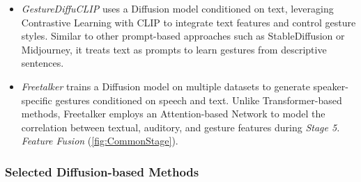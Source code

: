 \begin{itemize}
	\item \textit{GestureDiffuCLIP} \citep{ao2023gesturediffuclip} uses a Diffusion model conditioned on text, leveraging Contrastive Learning with CLIP to integrate text features and control gesture styles. Similar to other prompt-based approaches such as StableDiffusion or Midjourney, it treats text as prompts to learn gestures from descriptive sentences.
	
	\item \textit{Freetalker} \citep{yang2024freetalker} trains a Diffusion model on multiple datasets to generate speaker-specific gestures conditioned on speech and text. Unlike Transformer-based methods, Freetalker employs an Attention-based Network to model the correlation between textual, auditory, and gesture features during \textit{Stage 5. Feature Fusion} (\autoref{fig:CommonStage}).
\end{itemize}


\vspace{-0.2cm}
\subsubsection{Selected Diffusion-based Methods}


